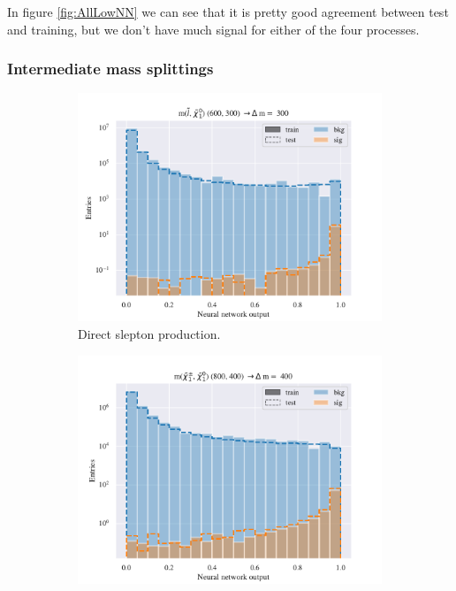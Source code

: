 In figure \ref{fig:AllLowNN} we can see that it is pretty good agreement between test and training, but we don't have much signal for either of the four processes. 













\subsubsection{Intermediate mass splittings}






\begin{figure}[H]
    \centering
    \begin{subfigure}[t!]{0.49\textwidth}
        \includegraphics[width = \textwidth]{Figures/SlepSlep/ML/NN/All_level/Inter/scaled_train_test_396014.pdf}
        \caption{Direct slepton production.}
        \label{fig:SlepslepNNLow}
    \end{subfigure}
    \begin{subfigure}[t!]{0.49\textwidth}
        \includegraphics[width = \textwidth]{Figures/SlepSnu/NN/All_level/Inter/scaled_train_test_397150.pdf}

\end{subfigure}
\end{figure}
